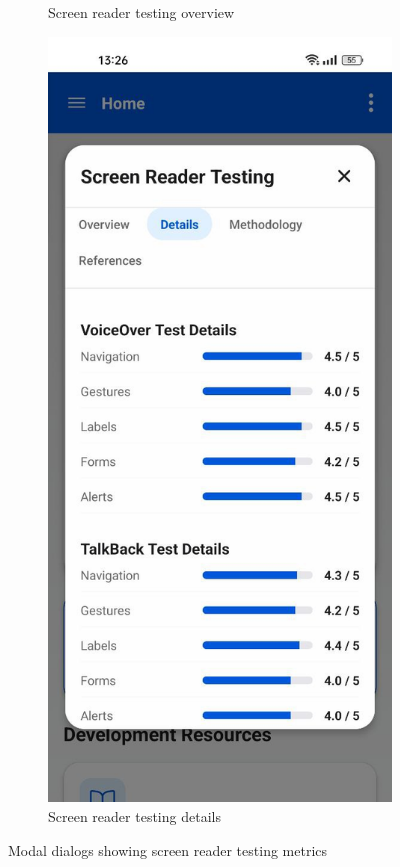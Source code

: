 \begin{figure}[ht]
\begin{subfigure}[b]{0.48\textwidth}
        \caption{Screen reader testing overview}
        \label{fig:screen-reader-overview}
    \end{subfigure}
    \hfill
    \begin{subfigure}[b]{0.48\textwidth}
        \centering
        \includegraphics[width=\linewidth]{img/screen-reader-details.jpg}
        \caption{Screen reader testing details}
        \label{fig:screen-reader-details}
    \end{subfigure}
    \caption{Modal dialogs showing screen reader testing metrics}
    \label{fig:screen_reader_modals}
\end{figure}

